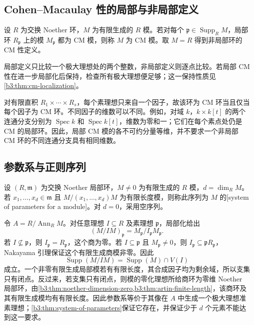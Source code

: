 \subsection{Cohen–Macaulay 性的局部与非局部定义}
\label{b3:subsec:1901:02}

\begin{definition}\label{b3:def:global-cohen-macaulay}
	设 \(R\) 为交换 Noether 环，\(M\) 为有限生成的 \(R\) 模。若对每个 \(\mathfrak p\in\operatorname{Supp}_RM\)，局部环 \(R_{\mathfrak p}\) 上的模 \(M_{\mathfrak p}\) 都为 CM 模，则称 \(M\) 为 CM 模。取 \(M=R\) 得到非局部环的 CM 性定义。
\end{definition}

局部定义只比较一个极大理想处的两个整数，非局部定义则逐点比较。若局部 CM 性在进一步局部化后保持，检查所有极大理想便足够；这一保持性质见\cref{b3:thm:cm-localization}。

\ProseParagraphBreak
对有限直积 \(R_1\times\cdots\times R_s\)，每个素理想只来自一个因子，故该环为 CM 环当且仅当每个因子为 CM 环。不同因子的维数可以不同。例如，对域 \(k\)，\(k\times k[t]\) 的两个连通分支分别为 \(\operatorname{Spec}k\) 和 \(\operatorname{Spec}k[t]\)，维数为零和一；它们在每个素点处仍是 CM 的局部环。因此，局部 CM 模的各不可约分量等维，并不要求一个非局部 CM 环的不同连通分支具有相同维数。

\subsection{参数系与正则序列}
\label{b3:subsec:1901:03}

\begin{definition}\label{b3:def:module-system-parameters}
	设 \((R,\mathfrak m)\) 为交换 Noether 局部环，\(M\ne0\) 为有限生成的 \(R\) 模，\(d=\dim_RM\)。若 \(x_1,\ldots,x_d\in\mathfrak m\) 且 \(M/(x_1,\ldots,x_d)M\) 为有限长度模，则称此序列为 \(M\) 的[system of parameters for a module]。对 \(d=0\)，采用空序列。
\end{definition}

令 \(A=R/\operatorname{Ann}_RM\)。对任意理想 \(I\subseteq R\) 及素理想 \(\mathfrak p\)，局部化给出
\[
	(M/IM)_{\mathfrak p} =M_{\mathfrak p}/I_{\mathfrak p}M_{\mathfrak p}.
\]
若 \(I\not\subseteq\mathfrak p\)，则 \(I_{\mathfrak p}=R_{\mathfrak p}\)，这个商为零。若 \(I\subseteq\mathfrak p\) 且 \(M_{\mathfrak p}\ne0\)，则 \(I_{\mathfrak p}\subseteq\mathfrak pR_{\mathfrak p}\)，Nakayama 引理保证这个有限生成商模非零。因此
\[
	\operatorname{Supp}(M/IM)=\operatorname{Supp}(M)\cap V(I)
\]
成立。一个非零有限生成局部模若有有限长度，其合成因子均为剩余域，所以支集只有闭点。反过来，若支集只有闭点，则模的零化理想所给商环为零维 Noether 局部环，由\cref{b3:thm:noether-dimension-zero,b3:thm:artin-finite-length}，该商环及其有限生成模均有有限长度。因此参数系等价于其像在 \(A\) 中生成一个极大理想准素理想；\cref{b3:thm:system-of-parameters}保证它存在，并保证少于 \(d\) 个元素不能达到这一要求。

